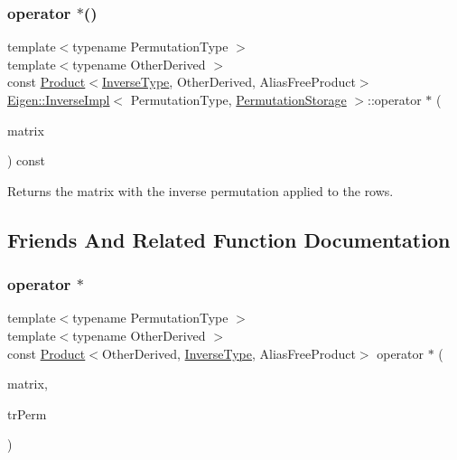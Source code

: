 \subsubsection{\texorpdfstring{operator $\ast$()}{operator *()}}
{\footnotesize\ttfamily template$<$typename Permutation\+Type $>$ \\
template$<$typename Other\+Derived $>$ \\
const \mbox{\hyperlink{class_eigen_1_1_product}{Product}}$<$\mbox{\hyperlink{class_eigen_1_1_inverse}{Inverse\+Type}}, Other\+Derived, Alias\+Free\+Product$>$ \mbox{\hyperlink{class_eigen_1_1_inverse_impl}{Eigen\+::\+Inverse\+Impl}}$<$ Permutation\+Type, \mbox{\hyperlink{struct_eigen_1_1_permutation_storage}{Permutation\+Storage}} $>$\+::operator $\ast$ (\begin{DoxyParamCaption}\item[{const \mbox{\hyperlink{class_eigen_1_1_matrix_base}{Matrix\+Base}}$<$ Other\+Derived $>$ \&}]{matrix }\end{DoxyParamCaption}) const\hspace{0.3cm}{\ttfamily [inline]}}

\begin{DoxyReturn}{Returns}
the matrix with the inverse permutation applied to the rows. 
\end{DoxyReturn}


\subsection{Friends And Related Function Documentation}
\mbox{\label{class_eigen_1_1_inverse_impl_3_01_permutation_type_00_01_permutation_storage_01_4_ae4c9e9b29b5caa6a617262fa60b16c57}} 
\subsubsection{\texorpdfstring{operator $\ast$}{operator *}}
{\footnotesize\ttfamily template$<$typename Permutation\+Type $>$ \\
template$<$typename Other\+Derived $>$ \\
const \mbox{\hyperlink{class_eigen_1_1_product}{Product}}$<$Other\+Derived, \mbox{\hyperlink{class_eigen_1_1_inverse}{Inverse\+Type}}, Alias\+Free\+Product$>$ operator $\ast$ (\begin{DoxyParamCaption}\item[{const \mbox{\hyperlink{class_eigen_1_1_matrix_base}{Matrix\+Base}}$<$ Other\+Derived $>$ \&}]{matrix,  }\item[{const \mbox{\hyperlink{class_eigen_1_1_inverse}{Inverse\+Type}} \&}]{tr\+Perm }\end{DoxyParamCaption})\hspace{0.3cm}{\ttfamily [friend]}}

